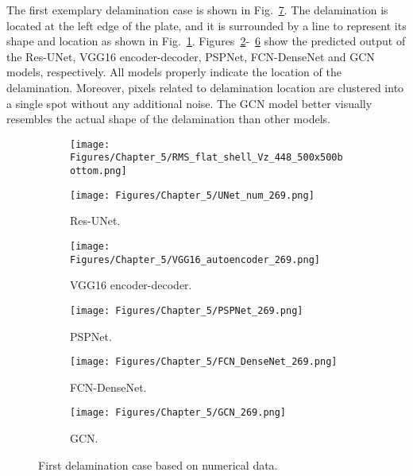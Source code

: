 The first exemplary delamination case is shown in Fig.~\ref{fig:rms_first_case}. 
The delamination is located at the left edge of the plate, and it is surrounded by a line to represent its shape and location as shown in Fig.~\ref{fig:RMS_bottom_448}.
Figures~\ref{fig:unet_269}-~\ref{fig:gcn_269} show the predicted output of the Res-UNet, VGG16 encoder-decoder, PSPNet, FCN-DenseNet and GCN models, respectively. 
All models properly indicate the location of the delamination. 
Moreover, pixels related to delamination location are clustered into a single spot without any additional noise. 
The GCN model better visually resembles the actual shape of the delamination than other models.
\begin{figure} [!h]
	\centering
	\begin{subfigure}[b]{.48\textwidth}
		\centering
		\texttt{[image: Figures/Chapter\_5/RMS\_flat\_shell\_Vz\_448\_500x500bottom.png]}
		\caption{}
		\label{fig:RMS_bottom_448}
	\end{subfigure}
	\hfill
	\begin{subfigure}[b]{.48\textwidth}
		\centering
		\texttt{[image: Figures/Chapter\_5/UNet\_num\_269.png]}
		\caption{Res-UNet.}
		\label{fig:unet_269}	
	\end{subfigure}
	\hfill
	\begin{subfigure}[b]{.48\textwidth}
		\centering
		\texttt{[image: Figures/Chapter\_5/VGG16\_autoencoder\_269.png]}
		\caption{VGG16 encoder-decoder.}
		\label{fig:vgg16_269}
	\end{subfigure}
	\hfill
	\begin{subfigure}[b]{.48\textwidth}
		\centering
		\texttt{[image: Figures/Chapter\_5/PSPNet\_269.png]}
		\caption{PSPNet.}
		\label{fig:pspnet_269}	
	\end{subfigure}
	\hfill
	\begin{subfigure}[b]{.48\textwidth}
		\centering
		\texttt{[image: Figures/Chapter\_5/FCN\_DenseNet\_269.png]}
		\caption{FCN-DenseNet.}
		\label{fig:densenet_269}
	\end{subfigure}
	\hfill
	\begin{subfigure}[b]{.48\textwidth}
		\centering
		\texttt{[image: Figures/Chapter\_5/GCN\_269.png]}
		\caption{GCN.}
		\label{fig:gcn_269}	
	\end{subfigure}
	\caption{First delamination case based on numerical data.}
	\label{fig:rms_first_case}
\end{figure}

